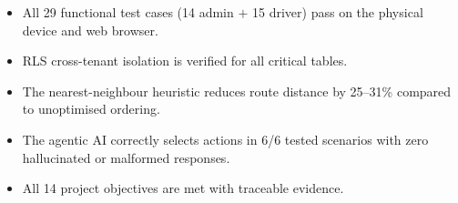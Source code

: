 \begin{itemize}
  \item All 29 functional test cases (14 admin $+$ 15 driver) pass on the
        physical device and web browser.
  \item RLS cross-tenant isolation is verified for all critical tables.
  \item The nearest-neighbour heuristic reduces route distance by 25--31\%
        compared to unoptimised ordering.
  \item The agentic AI correctly selects actions in 6/6 tested scenarios with
        zero hallucinated or malformed responses.
  \item All 14 project objectives are met with traceable evidence.
\end{itemize}
